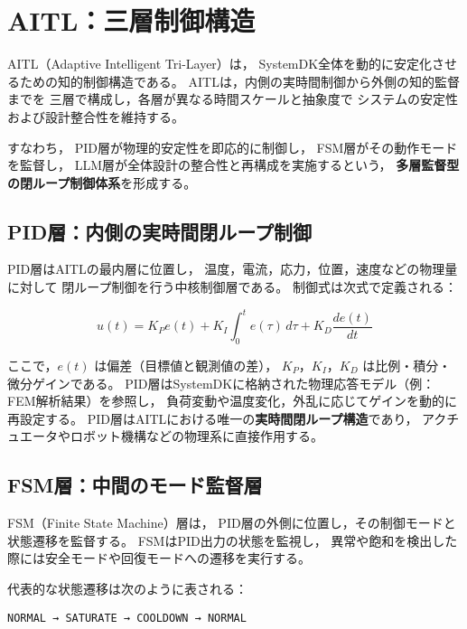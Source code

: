 \section{AITL：三層制御構造}

AITL（Adaptive Intelligent Tri-Layer）は，
SystemDK全体を動的に安定化させるための知的制御構造である。
AITLは，内側の実時間制御から外側の知的監督までを
三層で構成し，各層が異なる時間スケールと抽象度で
システムの安定性および設計整合性を維持する。

すなわち，
PID層が物理的安定性を即応的に制御し，
FSM層がその動作モードを監督し，
LLM層が全体設計の整合性と再構成を実施するという，
\textbf{多層監督型の閉ループ制御体系}を形成する。

\subsection{PID層：内側の実時間閉ループ制御}
PID層はAITLの最内層に位置し，
温度，電流，応力，位置，速度などの物理量に対して
閉ループ制御を行う中核制御層である。
制御式は次式で定義される：

\begin{equation}
u(t) = K_P e(t) + K_I \int_{0}^{t} e(\tau)\,d\tau + K_D \frac{de(t)}{dt}
\end{equation}

ここで，$e(t)$ は偏差（目標値と観測値の差），
$K_P$，$K_I$，$K_D$ は比例・積分・微分ゲインである。
PID層はSystemDKに格納された物理応答モデル（例：FEM解析結果）を参照し，
負荷変動や温度変化，外乱に応じてゲインを動的に再設定する。
PID層はAITLにおける唯一の\textbf{実時間閉ループ構造}であり，
アクチュエータやロボット機構などの物理系に直接作用する。

\subsection{FSM層：中間のモード監督層}
FSM（Finite State Machine）層は，
PID層の外側に位置し，その制御モードと状態遷移を監督する。
FSMはPID出力の状態を監視し，
異常や飽和を検出した際には安全モードや回復モードへの遷移を実行する。

代表的な状態遷移は次のように表される：

\begin{center}
\texttt{NORMAL → SATURATE → COOLDOWN → NORMAL}
\end{center}

